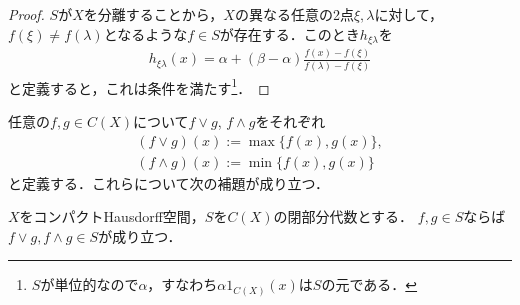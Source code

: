 \documentclass[../main.tex]{subfiles}
\begin{document}
\begin{proof}
\(S\)が\(X\)を分離することから，\(X\)の異なる任意の2点\(\xi, \lambda\)に対して，\(f(\xi) \neq f(\lambda)\)となるような\(f \in S\)が存在する．このとき\(h_{\xi\lambda}\)を
\begin{align*}
    h_{\xi\lambda}(x) = \alpha + (\beta - \alpha) \frac{f(x) - f(\xi)}{f(\lambda) - f(\xi)}
\end{align*}
と定義すると，これは条件を満たす\footnote{%
\(S\)が単位的なので\(\alpha\)，すなわち\(\alpha 1_{C(X)}(x)\)は\(S\)の元である．
}．
\end{proof}

任意の\(f, g \in C(X)\)について\(f \lor g\), \(f \land g\)をそれぞれ
\begin{gather*}
    (f \lor g)(x) := \max \{ f(x), g(x) \}, \\
    (f \land g)(x) := \min \{ f(x), g(x) \}
\end{gather*}
と定義する．これらについて次の補題が成り立つ．

\begin{thmbox}
\begin{lemma}
\(X\)をコンパクトHausdorff空間，\(S\)を\(C(X)\)の閉部分代数とする．
\(f, g \in S\)ならば\(f \lor g, f\land g \in S\)が成り立つ．
\end{lemma}
\end{thmbox}
\end{document}
